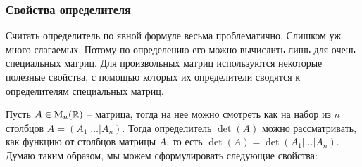 \documentclass{article}
\begin{document}
\subsubsection*{Свойства определителя}

Считать определитель по явной формуле весьма проблематично. Слишком уж много слагаемых. Потому по определению его можно вычислить лишь для очень специальных матриц. Для произвольных матриц используются некоторые полезные свойства, с помощью которых их определители сводятся к определителям специальных матриц.

Пусть $A\in \operatorname{M}_{n}(\mathbb R)$ -- матрица, тогда на нее можно смотреть как на набор из $n$ столбцов $A = (A_1|\ldots|A_n)$. Тогда определитель $\det (A)$ можно рассматривать, как функцию от столбцов матрицы $A$, то есть $\det (A) = \det(A_1|\ldots|A_n)$. Думаю таким образом, мы можем сформулировать следующие свойства:
\end{document}
